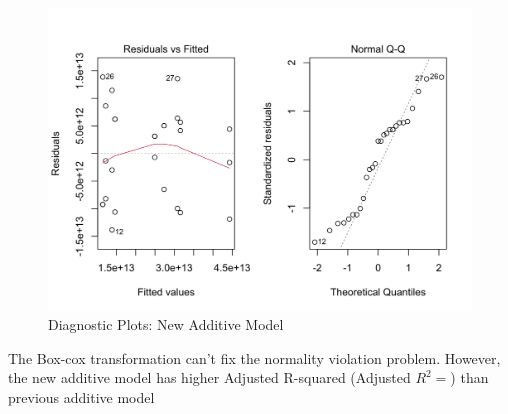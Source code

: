 \documentclass[11pt,a4paper]{article}
\begin{document}
\begin{figure}[htb]
    \centering
    \includegraphics[scale=0.3]{DP2}
    \caption{Diagnostic Plots: New Additive Model}
    \label{}
\end{figure}

The Box-cox transformation can't fix the normality violation problem. However, the new additive model has higher Adjusted R-squared (Adjusted $R^2=$) than previous additive model
\end{document}
